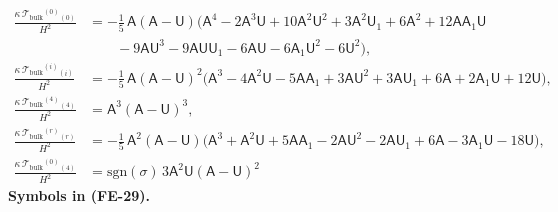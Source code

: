 \documentclass[
  10pt,
]{article}
\begin{document}
\[
\begin{aligned}
\frac{\kappa\,\mathcal{T}_{\mathrm{bulk}}{}^{(0)}{}_{(0)}}{H^2} &= -\frac15\,\mathsf{A}(\mathsf{A} - \mathsf{U})\big(\mathsf{A}^4 - 2\mathsf{A}^3\mathsf{U}
 + 10\mathsf{A}^2\mathsf{U}^2 + 3\mathsf{A}^2\mathsf{U}_1 + 6\mathsf{A}^2 + 12\mathsf{A}\mathsf{A}_1\mathsf{U}\\
&\qquad - 9\mathsf{A}\mathsf{U}^3 - 9\mathsf{A}\mathsf{U}\mathsf{U}_1 - 6\mathsf{A}\mathsf{U} - 6\mathsf{A}_1\mathsf{U}^2 - 6\mathsf{U}^2\big),\\
\frac{\kappa\,\mathcal{T}_{\mathrm{bulk}}{}^{(i)}{}_{(i)}}{H^2} &= -\frac15\,\mathsf{A}(\mathsf{A} - \mathsf{U})^2\big(\mathsf{A}^3 - 4\mathsf{A}^2\mathsf{U}
 - 5\mathsf{A}\mathsf{A}_1 + 3\mathsf{A}\mathsf{U}^2 + 3\mathsf{A}\mathsf{U}_1 + 6\mathsf{A} + 2\mathsf{A}_1\mathsf{U} + 12\mathsf{U}\big),\\
\frac{\kappa\,\mathcal{T}_{\mathrm{bulk}}{}^{(4)}{}_{(4)}}{H^2} &= \mathsf{A}^3(\mathsf{A} - \mathsf{U})^3,\\
\frac{\kappa\,\mathcal{T}_{\mathrm{bulk}}{}^{(r)}{}_{(r)}}{H^2} &= -\frac15\,\mathsf{A}^2(\mathsf{A} - \mathsf{U})\big(\mathsf{A}^3 + \mathsf{A}^2\mathsf{U}
 + 5\mathsf{A}\mathsf{A}_1 - 2\mathsf{A}\mathsf{U}^2 - 2\mathsf{A}\mathsf{U}_1 + 6\mathsf{A} - 3\mathsf{A}_1\mathsf{U} - 18\mathsf{U}\big),\\
\frac{\kappa\,\mathcal{T}_{\mathrm{bulk}}{}^{(0)}{}_{(4)}}{H^2} &= \mathrm{sgn}(\sigma)\,3\mathsf{A}^2\mathsf{U}(\mathsf{A} - \mathsf{U})^2
\end{aligned} \tag{FE-29}
\] \textbf{Symbols in (FE-29).}
\end{document}
